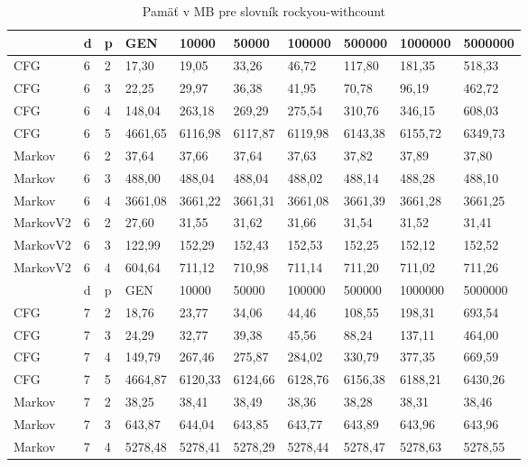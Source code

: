 \begin{table}[]
\centering
\caption{Pamäť v MB pre slovník rockyou-withcount}
\label{tbl:rockyouMemory}
\begin{tabular}{lll|lllllll}
       & d & p & GEN     & 10000  & 50000  & 100000 & 500000 & 1000000 & 5000000 \\ \hline
CFG    & 6 & 2 & 17,30   & 19,05  & 33,26  & 46,72  & 117,80 & 181,35  & 518,33 \\
CFG    & 6 & 3 & 22,25    & 29,97  & 36,38  & 41,95  & 70,78 & 96,19  & 462,72 \\
CFG    & 6 & 4 & 148,04   & 263,18  & 269,29   & 275,54  & 310,76 & 346,15  & 608,03 \\
CFG    & 6 & 5 & 4661,65 & 6116,98 & 6117,87 & 6119,98 & 6143,38 & 6155,72 & 6349,73 \\
Markov & 6 & 2 & 37,64   & 37,66   & 37,64   & 37,63   & 37,82   & 37,89   & 37,80   \\
Markov & 6 & 3 & 488,00  & 488,04  & 488,04  & 488,02  & 488,14  & 488,28  & 488,10  \\
Markov & 6 & 4 & 3661,08 & 3661,22 & 3661,31 & 3661,08 & 3661,39 & 3661,28 & 3661,25 \\
MarkovV2 & 6 & 2 & 27,60     & 31,55  & 31,62  & 31,66  & 31,54 & 31,52  & 31,41 \\
MarkovV2 & 6 & 3 & 122,99     & 152,29  & 152,43  & 152,53  & 152,25 & 152,12 & 152,52 \\
MarkovV2 & 6 & 4 & 604,64     & 711,12  & 710,98  & 711,14 & 711,20 & 711,02 & 711,26 \\ \hline
       & d & p & GEN     & 10000  & 50000  & 100000 & 500000 & 1000000 & 5000000 \\ \hline
CFG    & 7 & 2 & 18,76    & 23,77  & 34,06  & 44,46  & 108,55  & 198,31  & 693,54 \\
CFG    & 7 & 3 & 24,29   & 32,77   & 39,38  & 45,56  & 88,24 & 137,11  & 464,00 \\
CFG    & 7 & 4 & 149,79   & 267,46  & 275,87  & 284,02  & 330,79 & 377,35  & 669,59 \\
CFG    & 7 & 5 & 4664,87 & 6120,33 & 6124,66 & 6128,76 & 6156,38 & 6188,21 & 6430,26 \\
Markov & 7 & 2 & 38,25   & 38,41   & 38,49   & 38,36   & 38,28   & 38,31   & 38,46   \\
Markov & 7 & 3 & 643,87  & 644,04  & 643,85  & 643,77  & 643,89  & 643,96  & 643,96  \\
Markov & 7 & 4 & 5278,48 & 5278,41 & 5278,29 & 5278,44 & 5278,47 & 5278,63 & 5278,55 \\

\end{tabular}
\end{table}
